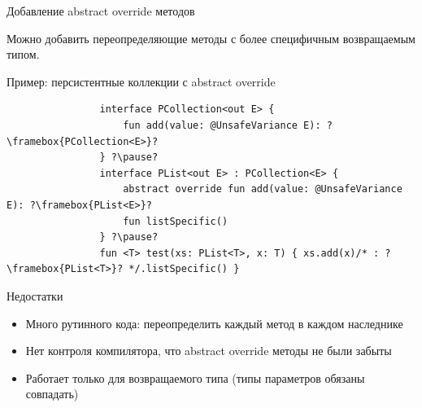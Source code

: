 \documentclass[handout,aspectratio=169,usenames,dvipsnames]{beamer}
\begin{document}
    \begin{frame}[fragile]{Добавление abstract override методов}


        Можно добавить переопределяющие методы с более специфичным возвращаемым типом.

        \begin{block}{Пример: персистентные коллекции с abstract override}
            \begin{verbatim}
                interface PCollection<out E> {
                    fun add(value: @UnsafeVariance E): ?\framebox{PCollection<E>}?
                } ?\pause?
                interface PList<out E> : PCollection<E> {
                    abstract override fun add(value: @UnsafeVariance E): ?\framebox{PList<E>}?
                    fun listSpecific()
                } ?\pause?
                fun <T> test(xs: PList<T>, x: T) { xs.add(x)/* : ?\framebox{PList<T>}? */.listSpecific() }
            \end{verbatim}
        \end{block}

        \pause

        \begin{block}{Недостатки}
            \begin{itemize}
                \item Много рутинного кода: переопределить каждый метод в каждом наследнике
                \item Нет контроля компилятора, что abstract override методы не были забыты
                \item Работает только для возвращаемого типа (типы параметров обязаны совпадать)
            \end{itemize}
        \end{block}
    \end{frame}
    \mode*
\end{document}
